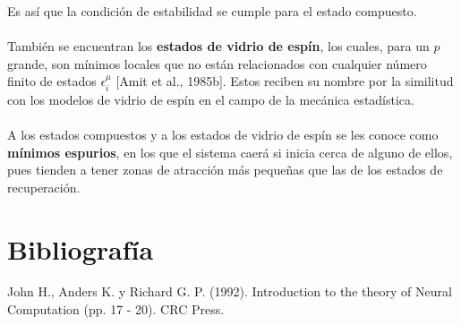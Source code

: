\documentclass{article}
\begin{document}
Es así que la condición de estabilidad se cumple para el estado compuesto.
\\\\
También se encuentran los \textbf{estados de vidrio de espín}, los cuales, para un $p$ grande, son mínimos locales que no están relacionados con cualquier número finito de estados $\epsilon_i^{\mu}$ [Amit et al., 1985b]. Estos reciben su nombre por la similitud con los modelos de vidrio de espín en el campo de la mecánica estadística.
\\\\
A los estados compuestos y a los estados de vidrio de espín se les conoce como \textbf{mínimos espurios}, en los que el sistema caerá si inicia cerca de alguno de ellos, pues tienden a tener zonas de atracción más pequeñas que las de los estados de recuperación. 

\section{Bibliografía}
\begin{thebibliography}{9}

 John H., Anders K. y Richard G. P. (1992). Introduction to the theory of Neural
Computation (pp. 17 - 20). CRC Press.
\end{thebibliography}
\end{document}
